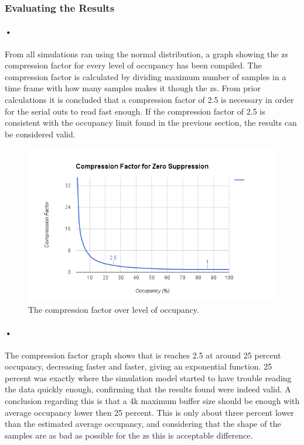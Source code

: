 \documentclass[a4paper, 12pt]{report}\dfrac{\right }{•}
\begin{document}
\subsubsection{Evaluating the Results}

\paragraph{•}
From all simulations ran using the normal distribution, a graph showing the \gls{zs} compression factor for every level of occupancy has been compiled.
The compression factor is calculated by dividing maximum number of samples in a time frame with how many samples makes it though the \gls{zs}.
From prior calculations it is concluded that a compression factor of 2.5 is necessary in order for the serial outs to read fast enough.
If the compression factor of 2.5 is consistent with the occupancy limit found in the previous section, the results can be considered valid.

\begin{figure}[h!]
	\centering
		\includegraphics[width=1.0\textwidth]{images/comp-factor-results.png}
		\caption{The compression factor over level of occupancy.}
		\label{fig:comp-factor-results}
\end{figure}

\paragraph{•}
The compression factor graph shows that is reaches 2.5 at around 25 percent occupancy, decreasing faster and faster, giving an exponential function.
25 percent was exactly where the simulation model started to have trouble reading the data quickly enough, confirming that the results found were indeed valid.
A conclusion regarding this is that a 4k maximum buffer size should be enough with average occupancy lower then 25 percent.
This is only about three percent lower than the estimated average occupancy, and considering that the shape of the samples are as bad as possible for the \gls{zs} this is acceptable difference.
\end{document}
